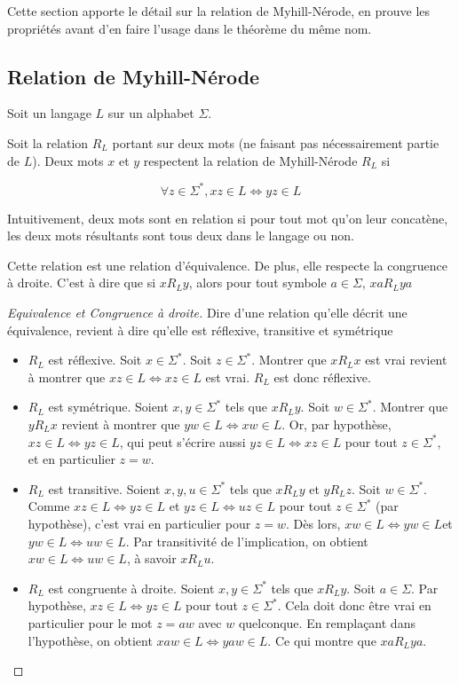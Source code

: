Cette section apporte le détail sur la relation de Myhill-Nérode, en prouve les propriétés avant d'en faire l'usage dans le théorème du même nom.




\subsection{Relation de Myhill-Nérode}

Soit un langage $L$ sur un alphabet $\Sigma$.

Soit la relation $R_L$ portant sur deux mots (ne faisant pas nécessairement partie de $L$). Deux mots $x$ et $y$ respectent la relation de Myhill-Nérode $R_L$ si 

$$\forall z \in \Sigma^*, xz \in L \Leftrightarrow yz \in L$$

Intuitivement, deux mots sont en relation si pour tout mot qu'on leur concatène, les deux mots résultants sont tous deux dans le langage ou non.

\begin{lemma}
	Cette relation est une relation d'équivalence. De plus, elle respecte la congruence à droite. C'est à dire que si $xR_Ly$, alors pour tout symbole $a \in \Sigma$, $xaR_Lya$
\end{lemma}

\begin{proof}[Equivalence et Congruence à droite]
	Dire d'une relation qu'elle décrit une équivalence, revient à dire qu'elle est réflexive, transitive et symétrique
\begin{itemize}
		\item $R_L$ est réflexive. Soit $x \in \Sigma^*$. Soit $z \in \Sigma^*$. Montrer que $xR_Lx$ est vrai revient à montrer que $ xz \in L \Leftrightarrow xz \in L$ est vrai. $R_L$ est donc réflexive.
		\item $R_L$ est symétrique. Soient $x, y \in \Sigma^*$ tels que $xR_Ly$. Soit $w \in \Sigma^*$. Montrer que $yR_Lx$ revient à montrer que $ yw \in L \Leftrightarrow xw \in L$. Or, par hypothèse, $ xz \in L \Leftrightarrow yz \in L$, qui peut s'écrire aussi $ yz \in L \Leftrightarrow xz \in L$ pour tout $z \in \Sigma^*$, et en particulier $z=w$.
		\item $R_L$ est transitive. Soient $x,y,u \in \Sigma^*$ tels que $xR_Ly$ et $yR_Lz$. Soit $w \in \Sigma^*$. Comme $ xz \in L \Leftrightarrow yz \in L$ et $ yz \in L \Leftrightarrow uz \in L$ pour tout $z \in \Sigma^*$ (par hypothèse), c'est vrai en particulier pour $z=w$. Dès lors,  $ xw \in L \Leftrightarrow yw \in L$et $ yw \in L \Leftrightarrow uw \in L$. Par transitivité de l'implication, on obtient $ xw \in L \Leftrightarrow uw \in L$, à savoir $xR_Lu$.
		\item $R_L$ est congruente à droite. Soient $x,y \in \Sigma^*$ tels que $xR_Ly$. Soit $a \in \Sigma$. Par hypothèse, $ xz \in L \Leftrightarrow yz \in L$ pour tout $z \in \Sigma^*$. Cela doit donc être vrai en particulier pour le mot $z=aw$ avec $w$ quelconque. En remplaçant dans l'hypothèse, on obtient  $ xaw \in L \Leftrightarrow yaw \in L$. Ce qui montre que $xaR_Lya$.
	\end{itemize}
\end{proof}


